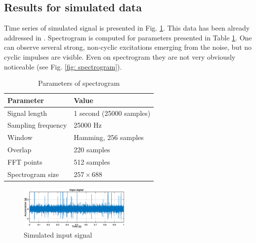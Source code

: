 \documentclass[journal]{IEEEtran}
\begin{document}


\subsection{Results for simulated data}

Time series of simulated  signal is presented in Fig. \ref{fig: input}. This data has been already addressed in \cite{wylomanskaimpulsive}. Spectrogram is computed for parameters presented in Table \ref{tab:tab1}. One can observe several strong, non-cyclic excitations emerging from the noise, but no cyclic impulses are visible. Even on spectrogram they are not very obviously noticeable (see Fig. \ref{fig: spectrogram}).
\begin{table}[ht!]
    \centering
    \caption{Parameters of spectrogram}
  \begin{tabular}{|l|l|}
    \hline
    \textbf{Parameter} & \textbf{Value} \\ \hline
         Signal length & 1 second (25000 samples) \\ \hline
         Sampling frequency & 25000 Hz \\ \hline
         Window & Hamming, 256 samples \\ \hline
         Overlap & 220 samples \\ \hline
         FFT points & 512 samples \\ \hline
         Spectrogram size &  $257 \times 688$\\

    \hline
    \end{tabular}
    \label{tab:tab1}
\end{table}

\begin{figure}[!ht]
\centering
\includegraphics[width = 0.48\textwidth]{figs3/input_sig.eps}
\caption{Simulated input signal}
\label{fig: input}
\end{figure}
\end{document}
